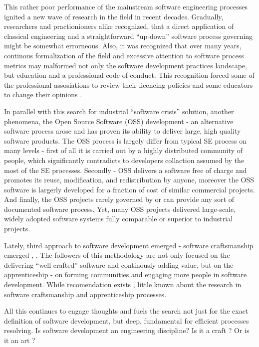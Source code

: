 This rather poor performance of the mainstream software engineering processes 
ignited a new wave of research in the field in recent decades. Gradually, researchers and 
practionioners alike recognized, that a direct application of classical engineering and a 
straightforward ``up-down'' software process governing might be somewhat errorneous. 
Also, it was recognized that over many years, continous formalization of the field and 
excessive attention to software process metrics may malformed not only the software development 
practices landscape, but education and a professional code of conduct. 
This recognition forced some of the professional assosiations 
to review their licencing policies \cite{citeulike:11045517} and some educators to change their 
opinions \cite{citeulike:5203446}. 

In parallel with this search for industrial ``software crisis'' solution, another phenomena, 
the Open Source Software (OSS) 
development - an alternative software process arose and has proven its ability to deliver 
large, high quality software products. The OSS process is largely differ from typical SE process
on many levels - first of all it is carried out by a highly distributed community of people,
which significantly contradicts to developers collaction assumed by the most of the SE processes.
Secondly - OSS delivers a software free of charge and promotes its reuse, modification, and 
redistribution by anyone, moreover the OSS software is largerly developed for a fraction of cost
of similar commercial projects. And finally, the OSS projects rarely governed by or can provide
any sort of documented software process. Yet, many OSS projects delivered large-scale, widely
adopted software systems fully comparable or superior to industrial projects.

Lately, third approach to software development emerged - software craftsmanship emerged 
\cite{citeulike:11058561}, \cite{citeulike:11058554}. The followers of this methodology 
are not only focused on the delivering ``well crafted'' software and continously adding value,
but on the apprenticeship - on forming communities and engaging more people in software development.
While recomendation exists \cite{citeulike:11058784}, little known about the research 
in software craftsmanship and apprenticeship processes.

All this continues to engage thoughts and fuels the search not just for the exact definition 
of software development, but deep, fundamental for efficient processes resolving. 
Is software development an engineering discipline? Is it a craft \cite{citeulike:5203446}? 
Or is it an art \cite{citeulike:11045694}?

